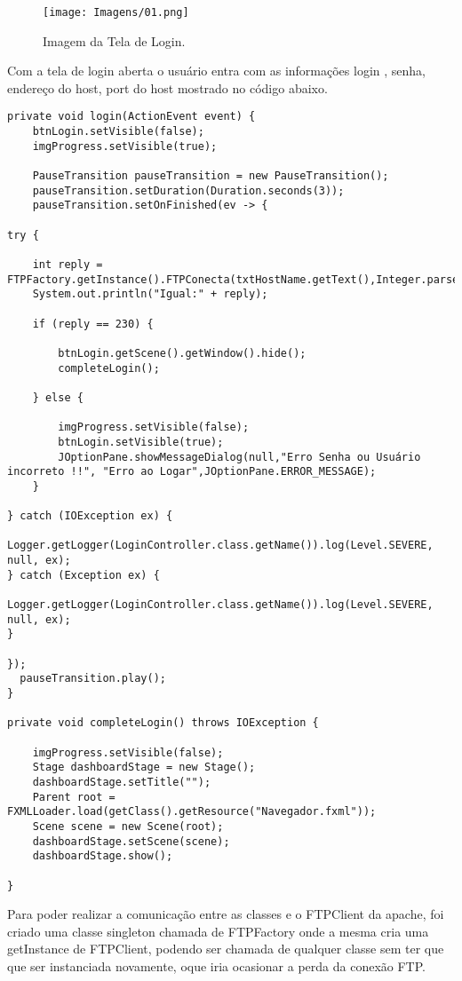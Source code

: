 \documentclass[12pt]{article}
\begin{document}
\begin{figure}[H]
	\centering
	\texttt{[image: Imagens/01.png]}
	\caption{ Imagem da Tela de Login.}
	\label{fig:01}
\end{figure}

Com a tela de login aberta o usuário entra com as informações login , senha, endereço do host, port do host mostrado no código abaixo.
\vspace{.4cm}
\begin{lstlisting}
private void login(ActionEvent event) {
	btnLogin.setVisible(false);
	imgProgress.setVisible(true);
	
	PauseTransition pauseTransition = new PauseTransition();
	pauseTransition.setDuration(Duration.seconds(3));
	pauseTransition.setOnFinished(ev -> {

try {
	
	int reply = FTPFactory.getInstance().FTPConecta(txtHostName.getText(),Integer.parseInt(txtHostPort.getText()),this.txtUsername.getText(),this.txtPassword.getText());
	System.out.println("Igual:" + reply);
	
	if (reply == 230) {
	
		btnLogin.getScene().getWindow().hide();
		completeLogin();
	
	} else {
	
		imgProgress.setVisible(false);
		btnLogin.setVisible(true);
		JOptionPane.showMessageDialog(null,"Erro Senha ou Usuário incorreto !!", "Erro ao Logar",JOptionPane.ERROR_MESSAGE);
	}

} catch (IOException ex) {
	Logger.getLogger(LoginController.class.getName()).log(Level.SEVERE, null, ex);
} catch (Exception ex) {
	Logger.getLogger(LoginController.class.getName()).log(Level.SEVERE, null, ex);
}

});
  pauseTransition.play();
}

private void completeLogin() throws IOException {
	
	imgProgress.setVisible(false);
	Stage dashboardStage = new Stage();
	dashboardStage.setTitle("");
	Parent root = FXMLLoader.load(getClass().getResource("Navegador.fxml"));
	Scene scene = new Scene(root);
	dashboardStage.setScene(scene);
	dashboardStage.show();
	
}

\end{lstlisting}


Para poder realizar a comunicação entre as classes e o FTPClient da apache, foi criado uma classe singleton chamada de FTPFactory onde a mesma cria uma getInstance de FTPClient, podendo ser chamada de qualquer classe sem ter que que ser instanciada novamente, oque iria ocasionar a perda da conexão FTP.
\end{document}
